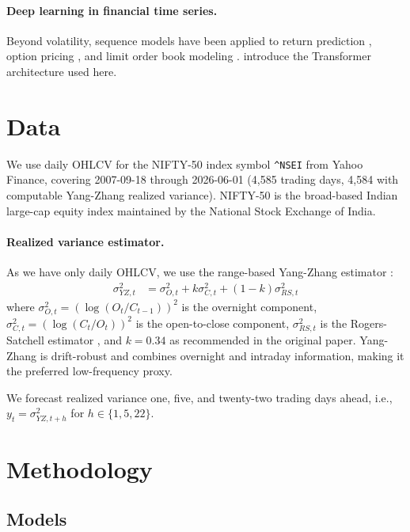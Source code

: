 \documentclass[11pt]{article}
\begin{document}
\paragraph{Deep learning in financial time series.} Beyond
volatility, sequence models have been applied to return prediction
\citep{sirignano2019universal}, option pricing
\citep{horvath2021deep}, and limit order book modeling
\citep{briola2020deep}. \citet{vaswani2017attention} introduce the
Transformer architecture used here.

\section{Data}
\label{sec:data}

We use daily OHLCV for the NIFTY-50 index symbol
\texttt{\textasciicircum NSEI} from Yahoo Finance, covering
2007-09-18 through 2026-06-01 (4{,}585 trading days, 4{,}584 with
computable Yang-Zhang realized variance). NIFTY-50 is the
broad-based Indian large-cap equity index maintained by the National
Stock Exchange of India.

\paragraph{Realized variance estimator.} As we have only daily
OHLCV, we use the range-based Yang-Zhang estimator
\citep{yang2000}:
\begin{align}
\sigma^2_{YZ,t} &= \sigma^2_{O,t} + k \sigma^2_{C,t} + (1-k) \sigma^2_{RS,t}
\end{align}
where $\sigma^2_{O,t} = (\log(O_t/C_{t-1}))^2$ is the overnight
component, $\sigma^2_{C,t} = (\log(C_t/O_t))^2$ is the open-to-close
component, $\sigma^2_{RS,t}$ is the Rogers-Satchell estimator
\citep{rogers1991}, and $k = 0.34$ as recommended in the original
paper. Yang-Zhang is drift-robust and combines overnight and
intraday information, making it the preferred low-frequency proxy.

We forecast realized variance one, five, and twenty-two trading
days ahead, i.e., $y_t = \sigma^2_{YZ,t+h}$ for $h \in \{1, 5, 22\}$.

\section{Methodology}
\label{sec:method}

\subsection{Models}
\end{document}
